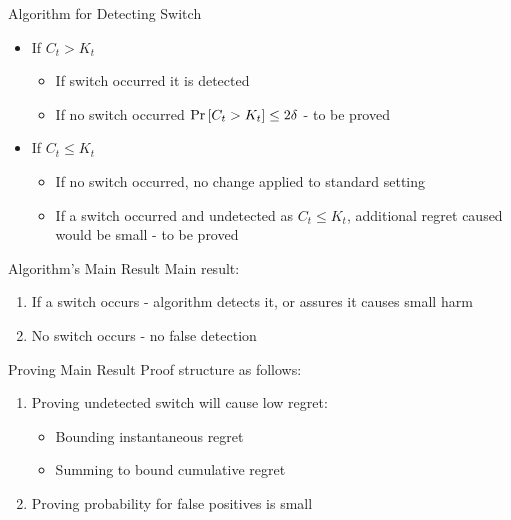 \documentclass{beamer}
\begin{document}
\begin{frame}{Algorithm for Detecting Switch}
\begin{itemize}
\item If $C_t>K_t$ \newline
\begin{itemize}
\item If switch occurred it is detected  \newline
\item If no switch occurred ${\rm Pr}\left[{C_t>K_t}\right]\leq 2\delta$ - to be proved  \newline
\end{itemize}
\item If $C_t\leq K_t$ \newline
\begin{itemize}
\item If no switch occurred, no change applied to standard setting   \newline
\item If a switch occurred and undetected as $C_t\leq K_t$, additional regret caused would be small - to be proved   \newline 
\end{itemize}
\end{itemize}
\end{frame}

\begin{frame}{Algorithm's Main Result}
Main result:\newline\newline
\begin{enumerate}
\item If a switch occurs - algorithm detects it, or assures it causes small harm\newline 
\item No switch occurs - no false detection
\end{enumerate}
\end{frame}

\begin{frame}{Proving Main Result}
Proof structure as follows:\newline
\begin{enumerate}
\item Proving undetected switch will cause low regret:\newline
\begin{itemize}
\item Bounding instantaneous regret \newline
\item Summing to bound cumulative regret \newline
\end{itemize}
\item Proving probability for false positives is small
\end{enumerate}
\end{frame}
\end{document}
